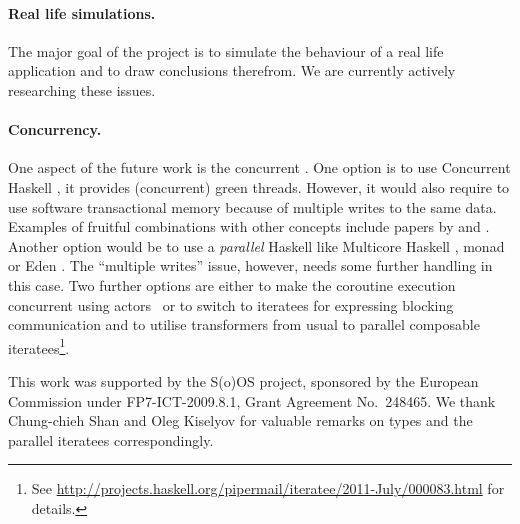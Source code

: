 \paragraph{Real life simulations.}
The major goal of the project is to simulate the behaviour of a real life application and to draw conclusions therefrom.
We are currently actively researching these issues.

\paragraph{Concurrency.}
One aspect of the future work is the concurrent \soosim.
One option is to use Concurrent Haskell \cite{ConcHs}, it provides (concurrent) green threads.
However, it would also require to use software transactional memory \cite{springerlink:10.1007/s004460050028} because of multiple writes to the same data.
Examples of fruitful combinations with other concepts include papers by \citeauthor{Harris:2008:CMT:1378704.1378725} \cite{Harris:2008:CMT:1378704.1378725} and \citeauthor{Bieniusa:2010:BAA:1835698.1835714} \cite{Bieniusa:2010:BAA:1835698.1835714,springerlink:10.1007/978-3-642-25959-3_2}.
Another option would be to use a \emph{parallel} Haskell like Multicore Haskell \cite{marlow:rsm},  monad \cite{par-monad} or Eden \cite{eden}.
The ``multiple writes'' issue, however, needs some further handling in this case.
Two further options are either to make the coroutine execution concurrent using actors~\cite{Hewitt:1973:UMA:1624775.1624804,sulzmann2008actors} or to switch to iteratees for expressing blocking communication and to utilise transformers from usual to parallel composable iteratees\footnote{See \url{http://projects.haskell.org/pipermail/iteratee/2011-July/000083.html} for details.}.

%

\acks

This work was supported by the S(o)OS project, sponsored by the European Commission under FP7-ICT-2009.8.1, Grant Agreement No.~248465.
We thank Chung-chieh Shan and Oleg Kiselyov for valuable remarks on
 types and the parallel iteratees correspondingly.

